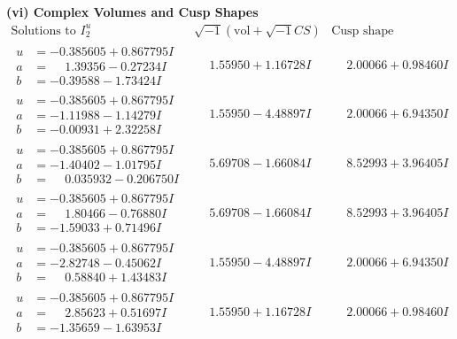 \documentclass[1p]{elsarticle_modified}
\theoremstyle{definition}
\newcommand{\I}{\sqrt{-1}}
\begin{document}
\newpage\flushleft \textbf{(vi) Complex Volumes and Cusp Shapes}
$$\begin{array}{c|c|c}  
\text{Solutions to }I^u_{2}& \I (\text{vol} + \sqrt{-1}CS) & \text{Cusp shape}\\
 \hline 
\begin{aligned}
u &= -0.385605 + 0.867795 I \\
a &= \phantom{-}1.39356 - 0.27234 I \\
b &= -0.39588 - 1.73424 I\end{aligned}
 & \phantom{-}1.55950 + 1.16728 I & \phantom{-}2.00066 + 0.98460 I \\ \hline\begin{aligned}
u &= -0.385605 + 0.867795 I \\
a &= -1.11988 - 1.14279 I \\
b &= -0.00931 + 2.32258 I\end{aligned}
 & \phantom{-}1.55950 - 4.48897 I & \phantom{-}2.00066 + 6.94350 I \\ \hline\begin{aligned}
u &= -0.385605 + 0.867795 I \\
a &= -1.40402 - 1.01795 I \\
b &= \phantom{-}0.035932 - 0.206750 I\end{aligned}
 & \phantom{-}5.69708 - 1.66084 I & \phantom{-}8.52993 + 3.96405 I \\ \hline\begin{aligned}
u &= -0.385605 + 0.867795 I \\
a &= \phantom{-}1.80466 - 0.76880 I \\
b &= -1.59033 + 0.71496 I\end{aligned}
 & \phantom{-}5.69708 - 1.66084 I & \phantom{-}8.52993 + 3.96405 I \\ \hline\begin{aligned}
u &= -0.385605 + 0.867795 I \\
a &= -2.82748 - 0.45062 I \\
b &= \phantom{-}0.58840 + 1.43483 I\end{aligned}
 & \phantom{-}1.55950 - 4.48897 I & \phantom{-}2.00066 + 6.94350 I \\ \hline\begin{aligned}
u &= -0.385605 + 0.867795 I \\
a &= \phantom{-}2.85623 + 0.51697 I \\
b &= -1.35659 - 1.63953 I\end{aligned}
 & \phantom{-}1.55950 + 1.16728 I & \phantom{-}2.00066 + 0.98460 I \\ \hline\begin{aligned}

\end{aligned}
\end{array}$$
\end{document}
